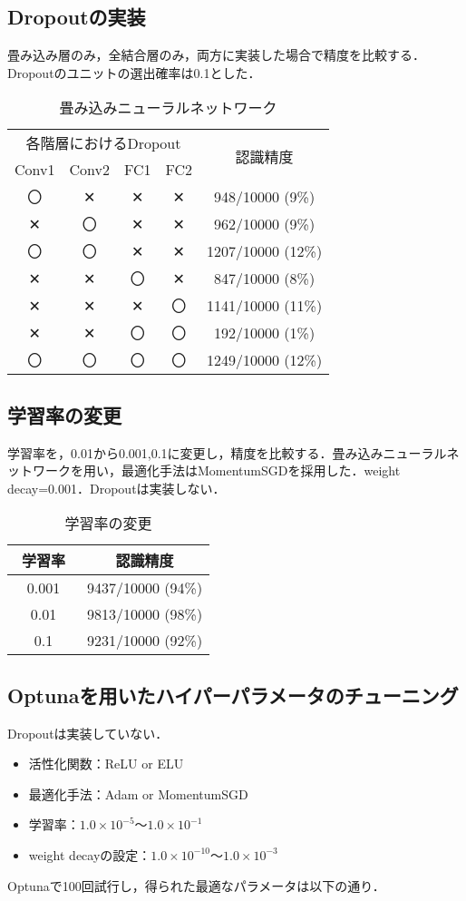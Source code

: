 \documentclass[a4paper, 12pt, dvipdfmx]{jarticle}
\begin{document}
\subsection{Dropoutの実装}
畳み込み層のみ，全結合層のみ，両方に実装した場合で精度を比較する．Dropoutのユニットの選出確率は0.1とした．
\begin{table}[htb]
  \centering
  \caption{畳み込みニューラルネットワーク}
  \begin{tabular}{cccc|c} \hline
    \multicolumn{4}{c}{各階層におけるDropout}　& \multirow{2}{*}{認識精度} \\
    Conv1 & Conv2 & FC1 & FC2 & \\ \hline
    〇 & ✕ & ✕ & ✕ & 948/10000 (9\%) \\
    ✕ & 〇 & ✕ & ✕ & 962/10000 (9\%) \\
    〇 & 〇 & ✕ & ✕ & 1207/10000 (12\%) \\
    ✕ & ✕ & 〇 & ✕ & 847/10000 (8\%) \\
    ✕ & ✕ & ✕ & 〇 &  1141/10000 (11\%) \\
    ✕ & ✕ & 〇 & 〇 &  192/10000 (1\%) \\
    〇 & 〇 & 〇 & 〇 & 1249/10000 (12\%)\\ \hline
  \end{tabular}
\end{table}

\subsection{学習率の変更}
学習率を，0.01から0.001,0.1に変更し，精度を比較する．畳み込みニューラルネットワークを用い，最適化手法はMomentumSGDを採用した．weight decay=0.001．Dropoutは実装しない．

\begin{table}[htb]
  \centering
  \caption{学習率の変更}
  \begin{tabular}{c|c} \hline
    学習率　& 認識精度 \\ \hline
    0.001 & 9437/10000 (94\%) \\
    0.01 & 9813/10000 (98\%) \\
    0.1 & 9231/10000 (92\%) \\ \hline
  \end{tabular}
\end{table}

\subsection{Optunaを用いたハイパーパラメータのチューニング}
Dropoutは実装していない．
\begin{itemize}
  \item 活性化関数：ReLU or ELU
  \item 最適化手法：Adam or MomentumSGD
  \item 学習率：$1.0\times 10^{-5}$～$1.0\times 10^{-1}$
  \item weight decayの設定：$1.0\times 10^{-10}$～$1.0\times 10^{-3}$
\end{itemize}
Optunaで100回試行し，得られた最適なパラメータは以下の通り．
\end{document}
